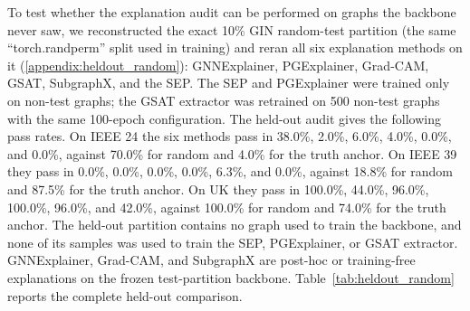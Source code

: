 To test whether the explanation audit can be performed on graphs the backbone never saw, we reconstructed the exact 10\% GIN random-test partition (the same ``torch.randperm'' split used in training) and reran all six explanation methods on it (\ref{appendix:heldout_random}): GNNExplainer, PGExplainer, Grad-CAM, GSAT, SubgraphX, and the SEP. The SEP and PGExplainer were trained only on non-test graphs; the GSAT extractor was retrained on 500 non-test graphs with the same 100-epoch configuration. The held-out audit gives the following pass rates. On IEEE 24 the six methods pass in 38.0\%, 2.0\%, 6.0\%, 4.0\%, 0.0\%, and 0.0\%, against 70.0\% for random and 4.0\% for the truth anchor. On IEEE 39 they pass in 0.0\%, 0.0\%, 0.0\%, 0.0\%, 6.3\%, and 0.0\%, against 18.8\% for random and 87.5\% for the truth anchor. On UK they pass in 100.0\%, 44.0\%, 96.0\%, 100.0\%, 96.0\%, and 42.0\%, against 100.0\% for random and 74.0\% for the truth anchor. The held-out partition contains no graph used to train the backbone, and none of its samples was used to train the SEP, PGExplainer, or GSAT extractor. GNNExplainer, Grad-CAM, and SubgraphX are post-hoc or training-free explanations on the frozen test-partition backbone. Table~\ref{tab:heldout_random} reports the complete held-out comparison.

\begin{table}[!htbp]
\centering
\caption{Predictive performance under random and contingency-disjoint graph splits. Values are mean $\pm$ SD over seeds 2--6. The interval is a two-sided 95\% $t$ interval with four degrees of freedom computed on the logit scale and back-transformed; it describes the five observed seeds, not a population interval over contingencies, and remains inside $[0,1]$.}
\label{tab:transfer}
\scriptsize
{}
\end{table}

